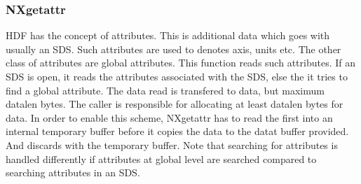 \documentclass[12pt]{article}
\begin{document}
\subsubsection{NXgetattr}
HDF has the concept of attributes. This is additional data which goes with
usually an SDS. Such attributes are used to denotes axis, units etc. The
other class of attributes are global attributes. This function reads such
attributes. If an SDS is open, it reads the attributes associated with the SDS, else
the it tries to find a global attribute. The data read is transfered to
data, but maximum datalen bytes. The caller is responsible for allocating at
least datalen bytes for data. In order to enable this scheme, NXgetattr
has to read the first into an internal temporary buffer before it copies the
data to the datat buffer provided. And discards with the temporary buffer.
Note that searching for attributes is handled differently if attributes at
global level are searched compared to searching attributes in an SDS.
\end{document}
